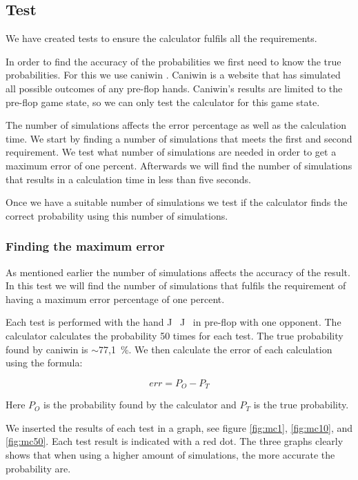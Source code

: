 \subsection{Test}
We have created tests to ensure the calculator fulfils all the requirements. 
 
In order to find the accuracy of the probabilities we first need to know the true probabilities. For this we use caniwin \cite{caniwin}. Caniwin is a website that has simulated all possible outcomes of any pre-flop hands. Caniwin's results are limited to the pre-flop game state, so we can only test the calculator for this game state.

The number of simulations affects the error percentage as well as the calculation time. We start by finding a number of simulations that meets the first and second requirement. We test what number of simulations are needed in order to get a maximum error of one percent. Afterwards we will find the number of simulations that results in a calculation time in less than five seconds.

Once we have a suitable number of simulations we test if the calculator finds the correct probability using this number of simulations.

\subsubsection{Finding the maximum error}
\label{sec:mc-test1}
As mentioned earlier the number of simulations affects the accuracy of the result. In this test we will find the number of simulations that fulfils the requirement of having a maximum error percentage of one percent.

Each test is performed with the hand J\clubsuit ~ J\diamondsuit ~ in pre-flop with one opponent. The calculator calculates the probability 50 times for each test. The true probability found by caniwin is $\sim$77,1~\%. 
We then calculate the error of each calculation using the formula:

\[err = P_{O} - P_{T}\]

Here $P_{O}$ is the probability found by the calculator and $P_{T} $ is the true probability. 

We inserted the results of each test in a graph, see figure \ref{fig:mc1}, \ref{fig:mc10}, and \ref{fig:mc50}. 
Each test result is indicated with a red dot. The three graphs clearly shows that when using a higher amount of simulations, the more accurate the probability are.

